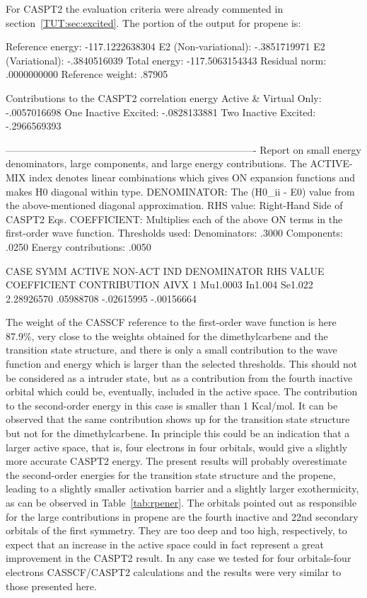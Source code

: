 For CASPT2 the evaluation criteria were already commented in 
section~\ref{TUT:sec:excited}. The portion of the  output for 
propene is:

\begin{sourcelisting}
      Reference energy:        -117.1222638304
      E2 (Non-variational):       -.3851719971
      E2 (Variational):           -.3840516039
      Total energy:            -117.5063154343
      Residual norm:               .0000000000
      Reference weight:            .87905

      Contributions to the CASPT2 correlation energy
      Active & Virtual Only:          -.0057016698
      One Inactive Excited:           -.0828133881
      Two Inactive Excited:           -.2966569393


----------------------------------------------------------------------------
Report on small energy denominators, large components, and large energy contributions.
The ACTIVE-MIX index denotes linear combinations which gives ON expansion functions
  and makes H0 diagonal within type.
DENOMINATOR: The (H0_ii - E0) value from the above-mentioned diagonal approximation.
RHS value: Right-Hand Side of CASPT2 Eqs.
COEFFICIENT: Multiplies each of the above ON terms in the first-order wave function.
Thresholds used:
        Denominators:  .3000
          Components:  .0250
Energy contributions:  .0050

CASE SYMM ACTIVE  NON-ACT IND    DENOMINATOR  RHS VALUE  COEFFICIENT CONTRIBUTION
AIVX  1  Mu1.0003 In1.004 Se1.022  2.28926570 .05988708  -.02615995  -.00156664
\end{sourcelisting}


The weight of the CASSCF reference to the first-order wave function is
here 87.9\%, very close to the weights obtained for the dimethylcarbene and
the transition state structure, 
and there is only a small contribution to the wave function and energy
which is larger than the selected thresholds. This should not be considered as a
intruder state, but as a contribution from the fourth inactive orbital which
could be, eventually, included in the active space. The contribution to the
second-order energy in this case is smaller than 1 Kcal/mol. It can be observed
that the same contribution shows up for the transition state structure but not
for the dimethylcarbene. In principle this could be an indication that a larger
active space, that is, four electrons in four orbitals, would give a slightly
more accurate CASPT2 energy. The present results will probably overestimate 
the second-order energies for the transition state structure and the propene,
leading to a slightly smaller activation barrier and a slightly larger
exothermicity, as can be observed in Table~\ref{tab:rpener}. The orbitals
pointed out as responsible for the large contributions in propene are the
fourth inactive and 22nd secondary orbitals of the first symmetry. They are
too deep and too high, respectively, to expect that an increase in the active
space could in fact represent a great improvement in the CASPT2 result.
In any case we tested for four orbitals-four electrons CASSCF/CASPT2 calculations
and the results were very similar to those presented here.


